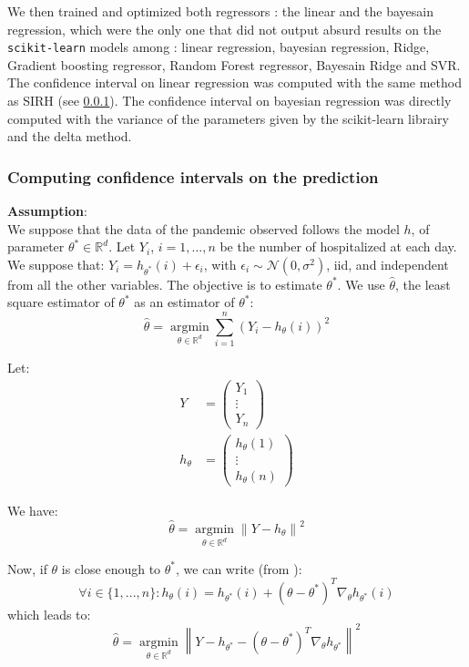 We then trained and optimized both regressors : the linear and the bayesain regression, which were the only one that did not output absurd results on the \texttt{scikit-learn} models among : linear regression, bayesian regression, Ridge, Gradient boosting regressor, Random Forest regressor, Bayesain Ridge and SVR. 
The confidence interval on linear regression was computed with the same method as SIRH (see \ref*{sec:ci}).
The confidence interval on bayesian regression was directly computed with the variance of the parameters given by the scikit-learn librairy and the delta method. 

\subsubsection{Computing confidence intervals on the prediction}
\label{sec:ci}

\textbf{Assumption}:
\\[0.5cm]
We suppose that the data of the pandemic observed follows the model $h$, of parameter $\theta^* \in \mathbb{R}^d$. Let $Y_i$, $ i = 1, \ldots, n$ be the number of hospitalized at each day. We suppose that: $Y_i = h_{\theta ^* } (i) + \epsilon_i$, with $\epsilon_i \sim \mathcal{N}(0, \sigma^2)$, iid, and independent from all the other variables. The objective is to estimate $\theta^*$. We use $\hat{\theta}$, the least square estimator of $\theta^*$ as an estimator of $\theta^* $:
\[
\hat{\theta} =  \underset{\theta \in \mathbb{R}^d}{\operatorname{argmin}} \sum_{i=1}^{n} (Y_i - h_{\theta}(i))^2
\]

Let:
\begin{align*}
Y &= \begin{pmatrix}
Y_1 \\
\vdots \\
Y_n
\end{pmatrix} \\
h_\theta &= \begin{pmatrix}
h_\theta(1) \\
\vdots \\
h_\theta(n)
\end{pmatrix}
\end{align*}

We have:
\[
\hat{\theta} =  \underset{\theta \in \mathbb{R}^d}{\operatorname{argmin}}  \left\lVert Y - h_\theta \right\rVert ^2
\]

Now, if $\theta$ is close enough to $\theta^*$, we can write (from \cite*{ruckstuhl2010introduction}):
\[
\forall i \in \{ 1, ..., n\} :  h_\theta(i) = h_{\theta^*} (i ) + (\theta - \theta^*)^T\nabla_\theta h_{\theta^*}(i) 
\]
which leads to:
\[
\hat{\theta} =  \underset{\theta \in \mathbb{R}^d}{\operatorname{argmin}}  \left\lVert Y - h_{\theta^*}  - (\theta - \theta^*)^T\nabla_\theta h_{\theta^*}\right\rVert ^2
\]

